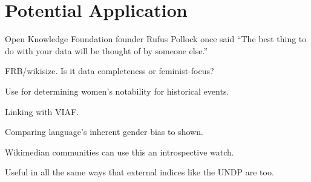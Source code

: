 \documentclass{sigchi-ext}
\begin{document}
\section{Potential Application}
Open Knowledge Foundation founder Rufus Pollock once said ``The best thing to do with your data will be thought of by someone else.”

FRB/wikisize. Is it data completeness or feminist-focus?


Use for determining women's notability for historical events.

Linking with VIAF. 

Comparing language's inherent gender bias to shown.

Wikimedian communities can use this an introspective watch.

Useful in all the same ways that external indices like the UNDP are too.

% 

% 

\end{document}
